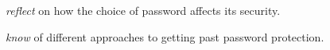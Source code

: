 \item \emph{reflect} on how the choice of password affects its security.
\item \emph{know} of different approaches to getting past password protection.
